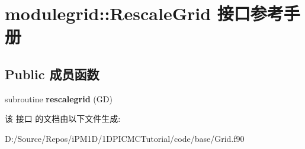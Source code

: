 \hypertarget{interfacemodulegrid_1_1_rescale_grid}{}\section{modulegrid\+::Rescale\+Grid 接口参考手册}
\label{interfacemodulegrid_1_1_rescale_grid}
\subsection*{Public 成员函数}
\begin{DoxyCompactItemize}
\item 
\mbox{\label{interfacemodulegrid_1_1_rescale_grid_a2bf441ddcf24e4f8aeabc9e9ae1bbfae}} 
subroutine {\bfseries rescalegrid} (GD)
\end{DoxyCompactItemize}


该 接口 的文档由以下文件生成\+:\begin{DoxyCompactItemize}
\item 
D\+:/\+Source/\+Repos/i\+P\+M1\+D/1\+D\+P\+I\+C\+M\+C\+Tutorial/code/base/Grid.\+f90\end{DoxyCompactItemize}
